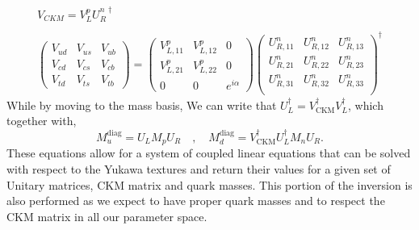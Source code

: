 \begin{equation}
\begin{gathered}
V_{CKM} = V_L^p U_R^{n\, \dagger}  \\ 
\\
\begin{pmatrix}
V_{ud} & V_{us} & V_{ub} \\
V_{cd} & V_{cs} & V_{cb} \\ 
V_{td} & V_{ts} & V_{tb} 
\end{pmatrix}  = \begin{pmatrix}
V_{L,11}^p & V_{L,12}^p & 0 \\ 
V_{L,21}^p & V_{L,22}^p & 0 \\ 
0 & 0 & e^{i \alpha} 
\end{pmatrix} \begin{pmatrix}
U_{R,11}^n & U_{R,12}^n & U_{R,13}^n \\
U_{R,21}^n & U_{R,22}^n & U_{R,23}^n \\
U_{R,31}^n & U_{R,32}^n & U_{R,33}^n \\
\end{pmatrix} ^\dagger 
\end{gathered} 
\end{equation}
%
While by moving to the mass basis, 
%
We can write that $U_L^\dagger = V^\dagger_{\text{CKM}} V_L^\dagger$, which together with,
\begin{equation}
M_u^{\text{diag}}  = U_L M_p U_R  \quad , \quad M_d^{\text{diag}}  = V^\dagger_{\text{CKM}} U_L^\dagger M_n U_R . 
\end{equation} 
%
These equations allow for a system of coupled linear equations that can be solved with respect to the Yukawa textures and return their values for a given set of Unitary matrices, CKM matrix and quark masses. 
%
This portion of the inversion is also performed as we expect to have proper quark masses and to respect the CKM matrix in all our parameter space.
% 

